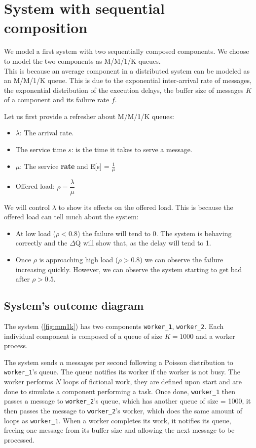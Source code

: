 \section{System with sequential composition}
    We model a first system with two sequentially composed components. We choose to model the two components as M/M/1/K queues. \\
    This is because an average component in a distributed system can be modeled as an M/M/1/K queue. This is due to the exponential inter-arrival rate of messages, the exponential distribution of the execution delays, the buffer size of messages $K$ of a component and its failure rate $f$. \cite{dq-tut}
    
    Let us first provide a refresher about M/M/1/K queues:
    \begin{itemize}
        \item $\lambda$: The arrival rate.
        \item The service time $s$: is the time it takes to serve a message.
        \item $\mu$: The service \textbf{rate} and E[s] = $\frac{1}{\mu}$
        \item Offered load: $\rho = \dfrac{\lambda}{\mu}$
    \end{itemize}

    We will control $\lambda$ to show its effects on the offered load. This is because the offered load can tell much about the system:
    \begin{itemize}
        \item At low load ($\rho < 0.8$) the failure will tend to 0. The system is behaving correctly and the $\Delta$Q will show that, as the delay will tend to 1.
        \item Once $\rho$ is approaching high load ($\rho > 0.8$) we can observe the failure increasing quickly. However, we can observe the system starting to get bad after $\rho > 0.5$. \cite{dq-tut}
    \end{itemize}
    
    \subsection{System's outcome diagram}
    The system (\cref{fig:mm1k}) has two components \texttt{worker\_1}, \texttt{worker\_2}. Each individual component is composed of a queue of size $K = 1000$ and a worker process.
    
    The system sends $n$ messages per second following a Poisson distribution to \texttt{worker\_1}'s queue. 
    The queue notifies its worker if the worker is not busy. The worker performs $N$ loops of fictional work, they are defined upon start and are done to simulate a component performing a task. Once done, \texttt{worker\_1} then passes a message to \texttt{worker\_2}'s queue, which has another queue of size = 1000, it then passes the message to \texttt{worker\_2}'s worker, which does the same amount of loops as \texttt{worker\_1}. When a worker completes its work, it notifies its queue, freeing one message from its buffer size and allowing the next message to be processed.
    
